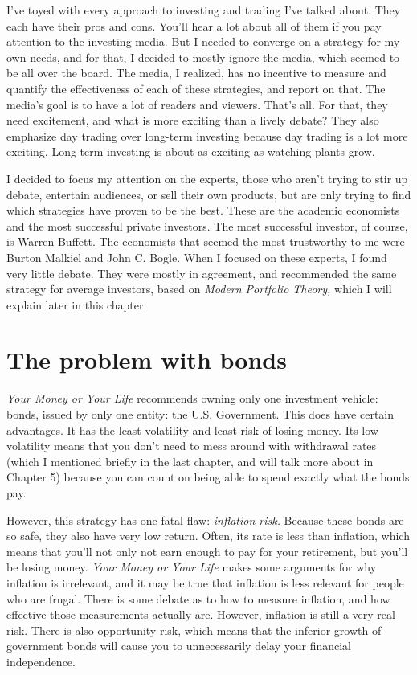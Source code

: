 I've toyed with every approach to investing and trading I've talked about. They each have their pros and cons. You'll hear a lot about all of them if you pay attention to the investing media. But I needed to converge on a strategy for my own needs, and for that, I decided to mostly ignore the media, which seemed to be all over the board. The media, I realized, has no incentive to measure and quantify the effectiveness of each of these strategies, and report on that. The media's goal is to have a lot of readers and viewers. That's all. For that, they need excitement, and what is more exciting than a lively debate? They also emphasize day trading over long-term investing because day trading is a lot more exciting. Long-term investing is about as exciting as watching plants grow.

I decided to focus my attention on the experts, those who aren't trying to stir up debate, entertain audiences, or sell their own products, but are only trying to find which strategies have proven to be the best. These are the academic economists and the most successful private investors. The most successful investor, of course, is Warren Buffett. The economists that seemed the most trustworthy to me were Burton Malkiel and John C. Bogle. When I focused on these experts, I found very little debate. They were mostly in agreement, and recommended the same strategy for average investors, based on \emph{Modern Portfolio Theory,} which I will explain later in this chapter.

\section{The problem with bonds}
\emph{Your Money or Your Life} recommends owning only one investment vehicle: bonds, issued by only one entity: the U.S. Government. This does have certain advantages. It has the least volatility and least risk of losing money. Its low volatility means that you don't need to mess around with withdrawal rates (which I mentioned briefly in the last chapter, and will talk more about in Chapter 5) because you can count on being able to spend exactly what the bonds pay.

However, this strategy has one fatal flaw: \emph{inflation risk.} Because these bonds are so safe, they also have very low return. Often, its rate is less than inflation, which means that you'll not only not earn enough to pay for your retirement, but you'll be losing money. \emph{Your Money or Your Life} makes some arguments for why inflation is irrelevant, and it may be true that inflation is less relevant for people who are frugal. There is some debate as to how to measure inflation, and how effective those measurements actually are. However, inflation is still a very real risk. There is also opportunity risk, which means that the inferior growth of government bonds will cause you to unnecessarily delay your financial independence.

